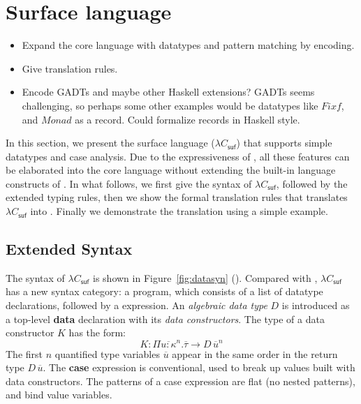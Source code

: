 \section{Surface language}
\label{sec:surface}


\begin{itemize}
\item Expand the core language with datatypes and pattern matching by encoding.
\item Give translation rules.
\item Encode GADTs and maybe other Haskell extensions? GADTs seems challenging, so perhaps some other examples would be datatypes like $Fix f$, and $Monad$ as a record. Could formalize records in Haskell style.
\end{itemize}

\newcommand{\sufcc}{$\lambda C_{\mathsf{suf}}$\xspace}

In this section, we present the surface language (\sufcc) that supports simple datatypes and case analysis. Due to the expressiveness of \name, all these features can be elaborated into the core language without extending the built-in language constructs of \name. In what follows, we first give the syntax of \sufcc, followed by the extended typing rules, then we show the formal translation rules that translates \sufcc into \name. Finally we demonstrate the translation using a simple example.

\subsection{Extended Syntax}

The syntax of \sufcc is shown in Figure~\ref{fig:datasyn} (). Compared with \name, \sufcc has a new syntax category: a program, which consists of a list of datatype declarations, followed by a expression. An \emph{algebraic data type} $D$ is introduced as a top-level \textbf{data} declaration with its \emph{data constructors}. The type of a data constructor $K$ has the form: \[K : \Pi\overline{u : \kappa}^{n}.\overline{\tau} \rightarrow D\,\overline{u}^{n} \] The first $n$ quantified type variables $\overline{u}$ appear in the same order in the return type $D\,\overline{u}$. The \textbf{case} expression is conventional, used to break up values built with data constructors. The patterns of a case expression are flat (no nested patterns), and bind value variables.

